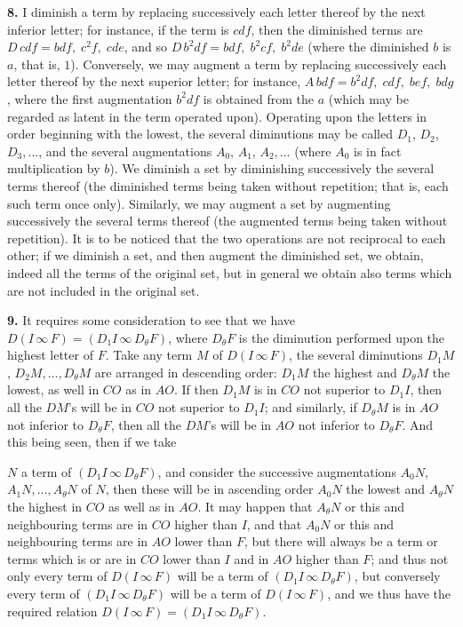 \documentclass[11pt]{article}
\begin{document}
\textbf{8.} I diminish a term by replacing successively each letter thereof by the next inferior letter; for instance, if the term is $cdf$, then the diminished terms are $D\,cdf = bdf,\; c^2 f,\; cde$, and so $D\,b^2 df = bdf,\; b^2 cf,\; b^2 de$ (where the diminished $b$ is $a$, that is, $1$). Conversely, we may augment a term by replacing successively each letter thereof by the next superior letter; for instance, $A\,bdf = b^2 df,\; cdf,\; bef,\; bdg$, where the first augmentation $b^2 df$ is obtained from the $a$ (which may be regarded as latent in the term operated upon). Operating upon the letters in order beginning with the lowest, the several diminutions may be called $D_1$, $D_2$, $D_3, \ldots$, and the several augmentations $A_0$, $A_1$, $A_2, \ldots$ (where $A_0$ is in fact multiplication by $b$). We diminish a set by diminishing successively the several terms thereof (the diminished terms being taken without repetition; that is, each such term once only). Similarly, we may augment a set by augmenting successively the several terms thereof (the augmented terms being taken without repetition). It is to be noticed that the two operations are not reciprocal to each other; if we diminish a set, and then augment the diminished set, we obtain, indeed all the terms of the original set, but in general we obtain also terms which are not included in the original set.

\textbf{9.} It requires some consideration to see that we have $D(I\,\infty\,F) = (D_1 I\,\infty\,D_\theta F)$, where $D_\theta F$ is the diminution performed upon the highest letter of $F$. Take any term $M$ of $D(I\,\infty\,F)$, the several diminutions $D_1 M$, $D_2 M, \ldots, D_\theta M$ are arranged in descending order: $D_1 M$ the highest and $D_\theta M$ the lowest, as well in $CO$ as in $AO$. If then $D_1 M$ is in $CO$ not superior to $D_1 I$, then all the $DM$'s will be in $CO$ not superior to $D_1 I$; and similarly, if $D_\theta M$ is in $AO$ not inferior to $D_\theta F$, then all the $DM$'s will be in $AO$ not inferior to $D_\theta F$. And this being seen, then if we take

$N$ a term of $(D_1 I\,\infty\,D_\theta F)$, and consider the successive augmentations $A_0 N$, $A_1 N, \ldots, A_\theta N$ of $N$, then these will be in ascending order $A_0 N$ the lowest and $A_\theta N$ the highest in $CO$ as well as in $AO$. It may happen that $A_\theta N$ or this and neighbouring terms are in $CO$ higher than $I$, and that $A_0 N$ or this and neighbouring terms are in $AO$ lower than $F$, but there will always be a term or terms which is or are in $CO$ lower than $I$ and in $AO$ higher than $F$; and thus not only every term of $D(I\,\infty\,F)$ will be a term of $(D_1 I\,\infty\,D_\theta F)$, but conversely every term of $(D_1 I\,\infty\,D_\theta F)$ will be a term of $D(I\,\infty\,F)$, and we thus have the required relation $D(I\,\infty\,F) = (D_1 I\,\infty\,D_\theta F)$.
\end{document}
